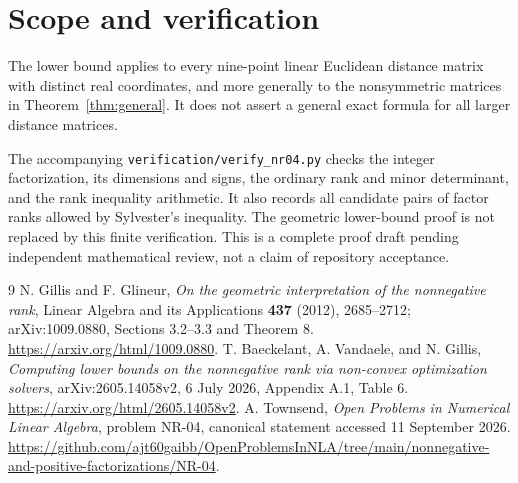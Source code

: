 \documentclass[11pt]{article}
\begin{document}
\section{Scope and verification}
The lower bound applies to every nine-point linear Euclidean distance matrix with distinct real coordinates, and more generally to the nonsymmetric matrices in Theorem~\ref{thm:general}. It does not assert a general exact formula for all larger distance matrices.

The accompanying \texttt{verification/verify\_nr04.py} checks the integer factorization, its dimensions and signs, the ordinary rank and minor determinant, and the rank inequality arithmetic. It also records all candidate pairs of factor ranks allowed by Sylvester's inequality. The geometric lower-bound proof is not replaced by this finite verification. This is a complete proof draft pending independent mathematical review, not a claim of repository acceptance.

\begin{thebibliography}{9}
 N. Gillis and F. Glineur, \emph{On the geometric interpretation of the nonnegative rank}, Linear Algebra and its Applications \textbf{437} (2012), 2685--2712; arXiv:1009.0880, Sections 3.2--3.3 and Theorem 8.
\url{https://arxiv.org/html/1009.0880}.
 T. Baeckelant, A. Vandaele, and N. Gillis, \emph{Computing lower bounds on the nonnegative rank via non-convex optimization solvers}, arXiv:2605.14058v2, 6 July 2026, Appendix A.1, Table 6.
\url{https://arxiv.org/html/2605.14058v2}.
 A. Townsend, \emph{Open Problems in Numerical Linear Algebra}, problem NR-04, canonical statement accessed 11 September 2026.
\url{https://github.com/ajt60gaibb/OpenProblemsInNLA/tree/main/nonnegative-and-positive-factorizations/NR-04}.
\end{thebibliography}
\end{document}
